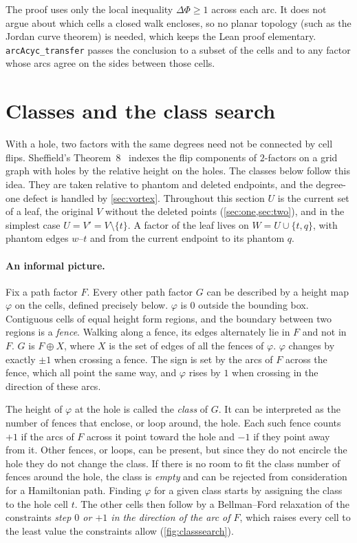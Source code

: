 \documentclass[11pt]{article}
\theoremstyle{plain}
\theoremstyle{definition}
\theoremstyle{remark}
\newcommand{\lean}[1]{\texttt{#1}}
\begin{document}
The proof uses only the local inequality $\Delta\Phi\ge1$ across each arc.
It does not argue about which cells a closed walk encloses, so no planar topology (such as the
Jordan curve theorem) is needed, which keeps the Lean proof elementary.
\lean{arcAcyc\_transfer} passes the conclusion to a subset of the cells and to any factor whose arcs
agree on the sides between those cells.

\section{Classes and the class search}
\label{sec:classes}

With a hole, two factors with the same degrees need not be connected by cell flips.
Sheffield's Theorem~8~\cite[\S4.1]{sheffield2000} indexes the flip components of $2$-factors on a
grid graph with holes by the relative height on the holes.
The classes below follow this idea.
They are taken relative to phantom and deleted endpoints, and the degree-one defect is handled by
\cref{sec:vortex}.
Throughout this section $U$ is the current set of a leaf, the original $V$ without the deleted
points (\cref{sec:one,sec:two}), and in the simplest case $U=V'=V\setminus\{t\}$.
A factor of the leaf lives on $W=U\cup\{t,q\}$, with phantom edges $w$--$t$ and from the current
endpoint to its phantom $q$.

\paragraph{An informal picture.}
Fix a path factor $F$.
Every other path factor $G$ can be described by a height map $\varphi$ on the cells, defined
precisely below.
$\varphi$ is $0$ outside the bounding box.
Contiguous cells of equal height form regions, and the boundary between two regions is a
\emph{fence}.
Walking along a fence, its edges alternately lie in $F$ and not in $F$.
$G$ is $F\oplus X$, where $X$ is the set of edges of all the fences of $\varphi$.
$\varphi$ changes by exactly $\pm1$ when crossing a fence.
The sign is set by the arcs of $F$ across the fence, which all point the same way, and $\varphi$
rises by $1$ when crossing in the direction of these arcs.

The height of $\varphi$ at the hole is called the \emph{class} of $G$.
It can be interpreted as the number of fences that enclose, or loop around, the hole.
Each such fence counts $+1$ if the arcs of $F$ across it point toward the hole and $-1$ if they
point away from it.
Other fences, or loops, can be present, but since they do not encircle the hole they do not change
the class.
If there is no room to fit the class number of fences around the hole, the class is \emph{empty}
and can be rejected from consideration for a Hamiltonian path.
Finding $\varphi$ for a given class starts by assigning the class to the hole cell $t$.
The other cells then follow by a Bellman--Ford relaxation of the constraints \emph{step $0$ or $+1$
in the direction of the arc of $F$}, which raises every cell to the least value the constraints allow
(\cref{fig:classsearch}).
\end{document}
